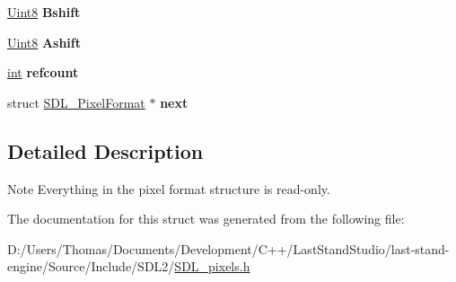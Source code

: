\begin{DoxyCompactItemize}
\item 
\hypertarget{structSDL__PixelFormat_a4212574b67529628d8822ed4eb109754}{}\hyperlink{SDL__stdinc_8h_a2944638813a090aa23e62f4da842c3e2}{Uint8} {\bfseries Bshift}\label{structSDL__PixelFormat_a4212574b67529628d8822ed4eb109754}

\item 
\hypertarget{structSDL__PixelFormat_ac3c4ffa0de1f2c94040340deede3bf46}{}\hyperlink{SDL__stdinc_8h_a2944638813a090aa23e62f4da842c3e2}{Uint8} {\bfseries Ashift}\label{structSDL__PixelFormat_ac3c4ffa0de1f2c94040340deede3bf46}

\item 
\hypertarget{structSDL__PixelFormat_a23be8060443d58064a720a4e2ef31729}{}\hyperlink{SDL__thread_8h_a6a64f9be4433e4de6e2f2f548cf3c08e}{int} {\bfseries refcount}\label{structSDL__PixelFormat_a23be8060443d58064a720a4e2ef31729}

\item 
\hypertarget{structSDL__PixelFormat_a1953b66c817116bf81bae4873ee6bce5}{}struct \hyperlink{structSDL__PixelFormat}{S\+D\+L\+\_\+\+Pixel\+Format} $\ast$ {\bfseries next}\label{structSDL__PixelFormat_a1953b66c817116bf81bae4873ee6bce5}

\end{DoxyCompactItemize}


\subsection{Detailed Description}
\begin{DoxyNote}{Note}
Everything in the pixel format structure is read-\/only. 
\end{DoxyNote}


The documentation for this struct was generated from the following file\+:\begin{DoxyCompactItemize}
\item 
D\+:/\+Users/\+Thomas/\+Documents/\+Development/\+C++/\+Last\+Stand\+Studio/last-\/stand-\/engine/\+Source/\+Include/\+S\+D\+L2/\hyperlink{SDL__pixels_8h}{S\+D\+L\+\_\+pixels.\+h}\end{DoxyCompactItemize}
